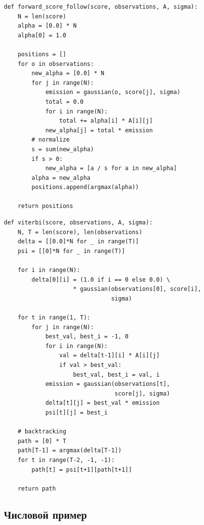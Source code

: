 \documentclass[a4paper,11pt]{article}
\begin{document}
\begin{algbox}[title={Forward-алгоритм (online score-following)}]
\begin{lstlisting}[style=python, numbers=none]
def forward_score_follow(score, observations, A, sigma):
    N = len(score)
    alpha = [0.0] * N
    alpha[0] = 1.0

    positions = []
    for o in observations:
        new_alpha = [0.0] * N
        for j in range(N):
            emission = gaussian(o, score[j], sigma)
            total = 0.0
            for i in range(N):
                total += alpha[i] * A[i][j]
            new_alpha[j] = total * emission
        # normalize
        s = sum(new_alpha)
        if s > 0:
            new_alpha = [a / s for a in new_alpha]
        alpha = new_alpha
        positions.append(argmax(alpha))

    return positions
\end{lstlisting}
\end{algbox}

\begin{algbox}[title={Алгоритм Viterbi}]
\begin{lstlisting}[style=python, numbers=none]
def viterbi(score, observations, A, sigma):
    N, T = len(score), len(observations)
    delta = [[0.0]*N for _ in range(T)]
    psi = [[0]*N for _ in range(T)]

    for i in range(N):
        delta[0][i] = (1.0 if i == 0 else 0.0) \
                    * gaussian(observations[0], score[i],
                               sigma)

    for t in range(1, T):
        for j in range(N):
            best_val, best_i = -1, 0
            for i in range(N):
                val = delta[t-1][i] * A[i][j]
                if val > best_val:
                    best_val, best_i = val, i
            emission = gaussian(observations[t],
                                score[j], sigma)
            delta[t][j] = best_val * emission
            psi[t][j] = best_i

    # backtracking
    path = [0] * T
    path[T-1] = argmax(delta[T-1])
    for t in range(T-2, -1, -1):
        path[t] = psi[t+1][path[t+1]]

    return path
\end{lstlisting}
\end{algbox}

\subsection{Числовой пример}
\end{document}
